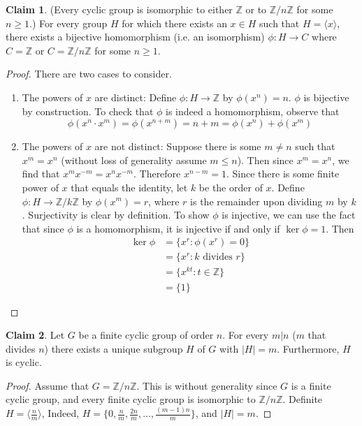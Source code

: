 \documentclass[12pt]{article}
\theoremstyle{definition}
\newcommand{\Z}{\mathbb{Z}}
\newtheorem{claim}{\color{JungleGreen}Claim}
\theoremstyle{definition}
\begin{document}
\begin{claim}(Every cyclic group is isomorphic to either $\mathbb{Z}$ or to $\mathbb{Z} / n \mathbb{Z}$ for some $n \geq 1$.) For every group $H$ for which there exists an $x \in H$ such that $H = \langle x \rangle$, there exists a bijective homomorphism (i.e. an isomorphism) $\phi : H \to C$ where $C = \mathbb{Z}$ or $C = \mathbb{Z} / n \mathbb{Z}$ for some $n \geq 1$.
\end{claim}
\begin{proof}
There are two cases to consider. 
\begin{enumerate}
	\item The powers of $x$ are distinct: Define $\phi : H \to \mathbb{Z}$ by $\phi(x^n) = n$. $\phi$ is bijective by construction. To check that $\phi$ is indeed a homomorphism, observe that
	\begin{equation}
		\phi(x^n \cdot x^m) = \phi(x^{n+m}) = n + m = \phi(x^n) + \phi(x^m)
	\end{equation}
	\item The powers of $x$ are not distinct: Suppose there is some $m \neq n$ such that $x^m = x^n$ (without loss of generality assume $m \leq n$). Then since $x^m = x^n$, we find that $x^m x^{-m} = x^n x^{-m}$. Therefore $x^{n-m} = 1$. Since there is some finite power of $x$ that equals the identity, let $k$ be the order of $x$. Define $\phi : H \to \mathbb{Z} / k \mathbb{Z}$ by $\phi(x^m) = r$, where $r$ is the remainder upon dividing $m$ by $k$. Surjectivity is clear by definition. To show $\phi$ is injective, we can use the fact that since $\phi$ is a homomorphism, it is injective if and only if $\ker{\phi} = 1$. Then
	\begin{align*}
		\ker{\phi} &= \{x^r : \phi(x^r) = 0 \} \\
		&= \{x^r : k \text{ divides } r \} \\
		&= \{x^{kt} : t \in \Z \} \\
		&= \{ 1 \} \tag{since $k$ is the order of $x$}
	\end{align*}
\end{enumerate}
\end{proof}

\begin{claim}
Let $G$ be a finite cyclic group of order $n$. For every $m | n$ ($m$ that divides $n$) there exists a unique subgroup $H$ of $G$ with $|H|=m$. Furthermore, $H$ is cyclic.
\end{claim}
\begin{proof}
Assume that $G = \mathbb{Z} / n \mathbb{Z}$. This is without generality since $G$ is a finite cyclic group, and every finite cyclic group is isomorphic to $\mathbb{Z} / n \mathbb{Z}$. Definite $H = \langle \frac{n}{m} \rangle$, Indeed, $H = \{ 0, \frac{n}{m}, \frac{2n}{m}, \ldots, \frac{(m-1)n}{m} \}$, and $|H| = m$. 
\end{proof}
\end{document}
